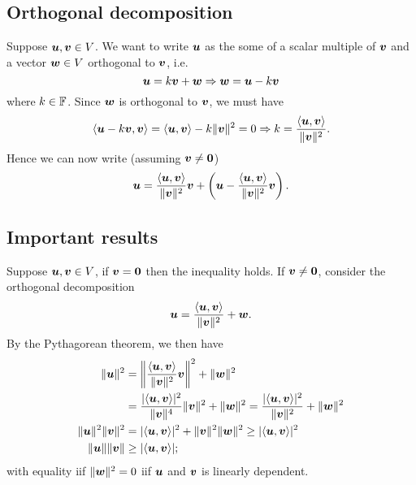 \documentclass{report}
\begin{document}
	\subsection{Orthogonal decomposition}
	Suppose $\bmu,\bmv\in V$. We want to write $\bmu$ as the some of a scalar multiple of $\bmv$ and a vector $\bmw\in V$ orthogonal to $\bmv$, i.e.
	$$\bmu=k\bmv+\bmw \Rightarrow \bmw=\bmu-k\bmv$$
	where $k\in\FF$. Since $\bmw$ is orthogonal to $\bmv$, we must have
	$$\lsp\bmu-k\bmv,\bmv\rsp=\lsp\bmu,\bmv\rsp-k\|\bmv\|^2=0 \Rightarrow k=\frac{\lsp\bmu,\bmv\rsp}{\|\bmv\|^2}.$$ 
	Hence we can now write (assuming $\bmv\neq\bzero$)
	$$\bmu=\frac{\lsp\bmu,\bmv\rsp}{\|\bmv\|^2}\bmv+\lt(\bmu-\frac{\lsp\bmu,\bmv\rsp}{\|\bmv\|^2}\bmv\rt).$$
	\pagebreak
	
	\subsection{Important results}
	\begin{myproof}
		Suppose $\bmu,\bmv\in V$, if $\bmv=\bzero$ then the inequality holds. If $\bmv\neq\bzero$, consider the orthogonal decomposition
		$$\bmu=\frac{\lsp\bmu,\bmv\rsp}{\|\bmv\|^2}+\bmw.$$
		By the Pythagorean theorem, we then have
		\begin{align*}
			\|\bmu\|^2&=\lt\|\frac{\lsp\bmu,\bmv\rsp}{\|\bmv\|^2}\bmv\rt\|^2+\|\bmw\|^2\\
			&=\frac{|\lsp\bmu,\bmv\rsp|^2}{\|\bmv\|^4}\|\bmv\|^2+\|\bmw\|^2=\frac{|\lsp\bmu,\bmv\rsp|^2}{\|\bmv\|^2}+\|\bmw\|^2\\
			\|\bmu\|^2\|\bmv\|^2&=|\lsp\bmu,\bmv\rsp|^2+\|\bmv\|^2\|\bmw\|^2\geq |\lsp\bmu,\bmv\rsp|^2\\
			\|\bmu\|\|\bmv\|&\geq |\lsp\bmu,\bmv\rsp|;\\
		\end{align*}
		with equality iif $\|\bmw\|^2=0$ iif $\bmu$ and $\bmv$ is linearly dependent. 
	\end{myproof}
\end{document}
